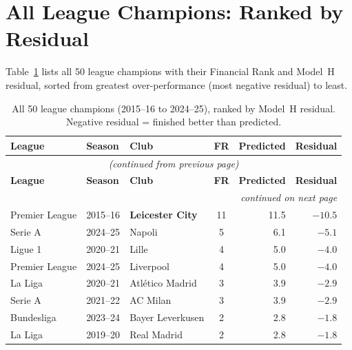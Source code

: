\documentclass[11pt, a4paper]{article}
\begin{document}
\section{All League Champions: Ranked by Residual}
\label{app:champions}

Table~\ref{tab:allchamps} lists all 50 league champions with their Financial Rank
and Model~H residual, sorted from greatest over-performance (most negative
residual) to least.

\begin{longtable}{l l l c r r}
  \caption{All 50 league champions (2015--16 to 2024--25), ranked by Model~H residual.
    Negative residual = finished better than predicted.}
  \label{tab:allchamps} \\
  \toprule
  \rowcolor{NavyBlue}
  \color{white}\textbf{League} &
  \color{white}\textbf{Season} &
  \color{white}\textbf{Club} &
  \color{white}\textbf{FR} &
  \color{white}\textbf{Predicted} &
  \color{white}\textbf{Residual} \\
  \midrule
  \endfirsthead
  \multicolumn{6}{c}{\small\textit{(continued from previous page)}} \\
  \toprule
  \rowcolor{NavyBlue}
  \color{white}\textbf{League} &
  \color{white}\textbf{Season} &
  \color{white}\textbf{Club} &
  \color{white}\textbf{FR} &
  \color{white}\textbf{Predicted} &
  \color{white}\textbf{Residual} \\
  \midrule
  \endhead
  \midrule
  \multicolumn{6}{r}{\small\textit{continued on next page}} \\
  \endfoot
  \bottomrule
  \endlastfoot
  \rowcolor{RowC}
  Premier League & 2015--16 & \textbf{Leicester City}  & 11 & 11.5 & $-10.5$ \\
  Serie A        & 2024--25 & Napoli                   &  5 &  6.1 & $-5.1$ \\
  Ligue 1        & 2020--21 & Lille                    &  4 &  5.0 & $-4.0$ \\
  Premier League & 2024--25 & Liverpool                &  4 &  5.0 & $-4.0$ \\
  La Liga        & 2020--21 & Atlético Madrid          &  3 &  3.9 & $-2.9$ \\
  Serie A        & 2021--22 & AC Milan                 &  3 &  3.9 & $-2.9$ \\
  Bundesliga     & 2023--24 & Bayer Leverkusen         &  2 &  2.8 & $-1.8$ \\
  La Liga        & 2019--20 & Real Madrid              &  2 &  2.8 & $-1.8$ \\

\end{longtable}
\end{document}
